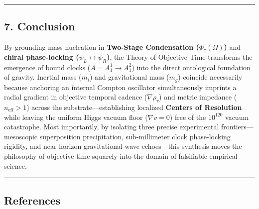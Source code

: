 \documentclass[
]{article}
\begin{document}
\begin{center}\rule{0.5\linewidth}{0.5pt}\end{center}

\subsection{7. Conclusion}\label{conclusion}

By grounding mass nucleation in \textbf{Two-Stage Condensation
(\(\Phi_\tau(\Omega)\))} and \textbf{chiral phase-locking
(\(\psi_L \leftrightarrow \psi_R\))}, the Theory of Objective Time
transforms the emergence of bound clocks (\(A = A_1^1 \to A_1^2\)) into
the direct ontological foundation of gravity. Inertial mass (\(m_i\))
and gravitational mass (\(m_g\)) coincide necessarily because anchoring
an internal Compton oscillator simultaneously imprints a radial gradient
in objective temporal cadence (\(\nabla\rho_\tau\)) and metric impedance
(\(n_{\mathrm{eff}} > 1\)) across the substrate---establishing localized
\textbf{Centers of Resolution} while leaving the uniform Higgs vacuum
floor (\(\nabla v = 0\)) free of the \(10^{120}\) vacuum catastrophe.
Most importantly, by isolating three precise experimental
frontiers---mesoscopic superposition precipitation, sub-millimeter clock
phase-locking rigidity, and near-horizon gravitational-wave
echoes---this synthesis moves the philosophy of objective time squarely
into the domain of falsifiable empirical science.

\begin{center}\rule{0.5\linewidth}{0.5pt}\end{center}

\subsection{References}\label{references}
\end{document}
